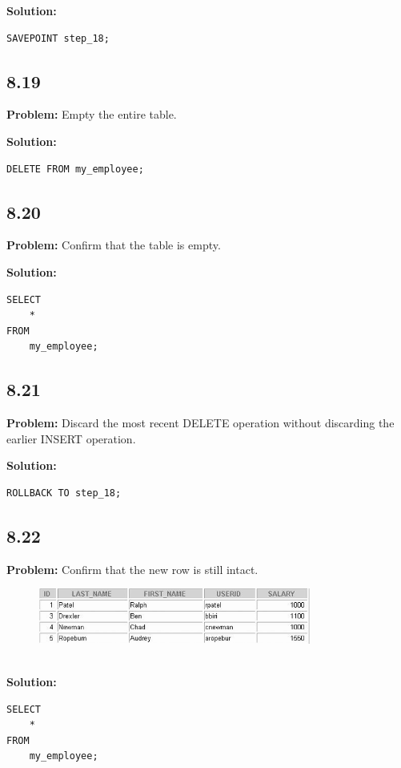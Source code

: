 \documentclass[12pt,a4paper]{article}
\begin{document}
\begin{itemize}
\textbf{Solution:}
\begin{lstlisting}
SAVEPOINT step_18;
\end{lstlisting}

\subsection*{8.19}
\textbf{Problem:} Empty the entire table.

\textbf{Solution:}
\begin{lstlisting}
DELETE FROM my_employee;
\end{lstlisting}

\subsection*{8.20}
\textbf{Problem:} Confirm that the table is empty.

\textbf{Solution:}
\begin{lstlisting}
SELECT 
    *
FROM
    my_employee;
\end{lstlisting}

\subsection*{8.21}
\textbf{Problem:} Discard the most recent DELETE operation without discarding the earlier INSERT operation.

\textbf{Solution:}
\begin{lstlisting}
ROLLBACK TO step_18;
\end{lstlisting}

\subsection*{8.22}
\textbf{Problem:} Confirm that the new row is still intact.
\\
\begin{figure}[htbp]
  \centering
  \includegraphics[width=0.8\textwidth]{Screenshots/822.png}
\end{figure}\\
\textbf{Solution:}
\begin{lstlisting}
SELECT 
    *
FROM
    my_employee;
\end{lstlisting}


\end{itemize}
\end{document}
